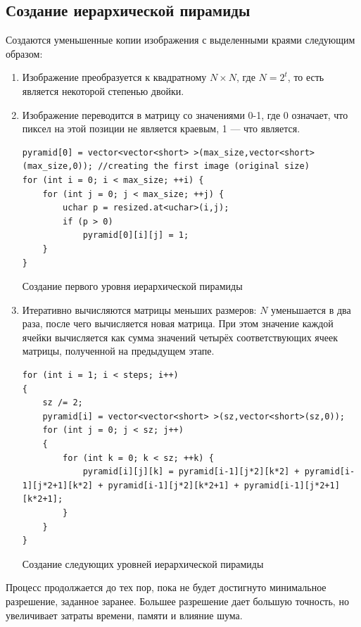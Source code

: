 \subsection{Создание иерархической пирамиды}
Создаются уменьшенные копии изображения с выделенными краями следующим образом:
\begin{enumerate}
  \item Изображение преобразуется к квадратному $N \times N$, где $N = 2^t$, то есть является некоторой степенью двойки.
  \item Изображение переводится в матрицу со значениями 0-1, где 0 означает, что пиксел на этой позиции не является краевым, 1 --- что является.

\begin{ListingEnv}[H]
\begin{lstlisting}
pyramid[0] = vector<vector<short> >(max_size,vector<short>(max_size,0)); //creating the first image (original size)
for (int i = 0; i < max_size; ++i) {
    for (int j = 0; j < max_size; ++j) {
        uchar p = resized.at<uchar>(i,j);
        if (p > 0)
            pyramid[0][i][j] = 1;
    }
}
\end{lstlisting}
\caption{Создание первого уровня иерархической пирамиды}
\label{list:level0}
\end{ListingEnv}
\item Итеративно вычисляются матрицы меньших размеров: $N$ уменьшается в два раза, после чего вычисляется новая матрица. 
При этом значение каждой ячейки вычисляется как сумма значений четырёх соответствующих ячеек матрицы, полученной на предыдущем этапе.

\begin{ListingEnv}[H]
\begin{lstlisting}
for (int i = 1; i < steps; i++)
{
    sz /= 2;
    pyramid[i] = vector<vector<short> >(sz,vector<short>(sz,0));
    for (int j = 0; j < sz; j++)
    {
        for (int k = 0; k < sz; ++k) {
            pyramid[i][j][k] = pyramid[i-1][j*2][k*2] + pyramid[i-1][j*2+1][k*2] + pyramid[i-1][j*2][k*2+1] + pyramid[i-1][j*2+1][k*2+1];
        }
    }
}
\end{lstlisting}
\caption{Создание следующих уровней иерархической пирамиды}
\label{list:otherlevels}
\end{ListingEnv}

\end{enumerate}

Процесс продолжается до тех пор, пока не будет достигнуто минимальное разрешение, заданное заранее. Большее разрешение дает большую точность, но увеличивает затраты времени, памяти и влияние шума.

